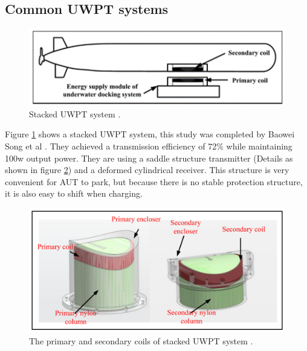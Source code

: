


\subsection{Common UWPT systems}

\begin{figure}[!t]
    \centering
    \includegraphics[width=0.7\linewidth]{images/1_stacked_UWPT_system.png}
    \caption{Stacked UWPT system \cite{Song}.}
    \label{fig:stacked UWPT system}
\end{figure}
Figure \ref{fig:stacked UWPT system} shows a stacked UWPT system, this study was completed by Baowei Song et al \cite{Song}. They achieved a transmission efficiency of 72\% while maintaining 100w output power.
They are using a saddle structure transmitter (Details as shown in figure \ref{fig:stacked UWPT system detail}) and a deformed cylindrical receiver. This structure is very convenient for AUT to park, but because there is no stable protection structure, it is also easy to shift when charging.

\begin{figure}[!t]
    \centering
    \includegraphics[width=0.7\linewidth]{images/1_stacked_UWPT_system_details.png}
    \caption{The primary and secondary coils of stacked UWPT system \cite{Song}.}
    \label{fig:stacked UWPT system detail}
\end{figure}

